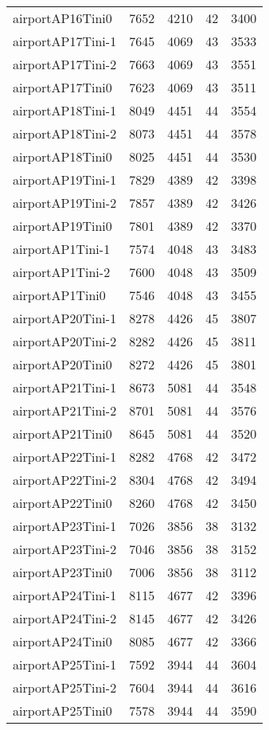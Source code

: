 \begin{longtable}{lrrrr}
airportAP16Tini0 & 7652 & 4210 & 42 & 3400 \\
airportAP17Tini-1 & 7645 & 4069 & 43 & 3533 \\
airportAP17Tini-2 & 7663 & 4069 & 43 & 3551 \\
airportAP17Tini0 & 7623 & 4069 & 43 & 3511 \\
airportAP18Tini-1 & 8049 & 4451 & 44 & 3554 \\
airportAP18Tini-2 & 8073 & 4451 & 44 & 3578 \\
airportAP18Tini0 & 8025 & 4451 & 44 & 3530 \\
airportAP19Tini-1 & 7829 & 4389 & 42 & 3398 \\
airportAP19Tini-2 & 7857 & 4389 & 42 & 3426 \\
airportAP19Tini0 & 7801 & 4389 & 42 & 3370 \\
airportAP1Tini-1 & 7574 & 4048 & 43 & 3483 \\
airportAP1Tini-2 & 7600 & 4048 & 43 & 3509 \\
airportAP1Tini0 & 7546 & 4048 & 43 & 3455 \\
airportAP20Tini-1 & 8278 & 4426 & 45 & 3807 \\
airportAP20Tini-2 & 8282 & 4426 & 45 & 3811 \\
airportAP20Tini0 & 8272 & 4426 & 45 & 3801 \\
airportAP21Tini-1 & 8673 & 5081 & 44 & 3548 \\
airportAP21Tini-2 & 8701 & 5081 & 44 & 3576 \\
airportAP21Tini0 & 8645 & 5081 & 44 & 3520 \\
airportAP22Tini-1 & 8282 & 4768 & 42 & 3472 \\
airportAP22Tini-2 & 8304 & 4768 & 42 & 3494 \\
airportAP22Tini0 & 8260 & 4768 & 42 & 3450 \\
airportAP23Tini-1 & 7026 & 3856 & 38 & 3132 \\
airportAP23Tini-2 & 7046 & 3856 & 38 & 3152 \\
airportAP23Tini0 & 7006 & 3856 & 38 & 3112 \\
airportAP24Tini-1 & 8115 & 4677 & 42 & 3396 \\
airportAP24Tini-2 & 8145 & 4677 & 42 & 3426 \\
airportAP24Tini0 & 8085 & 4677 & 42 & 3366 \\
airportAP25Tini-1 & 7592 & 3944 & 44 & 3604 \\
airportAP25Tini-2 & 7604 & 3944 & 44 & 3616 \\
airportAP25Tini0 & 7578 & 3944 & 44 & 3590 \\

\end{longtable}
